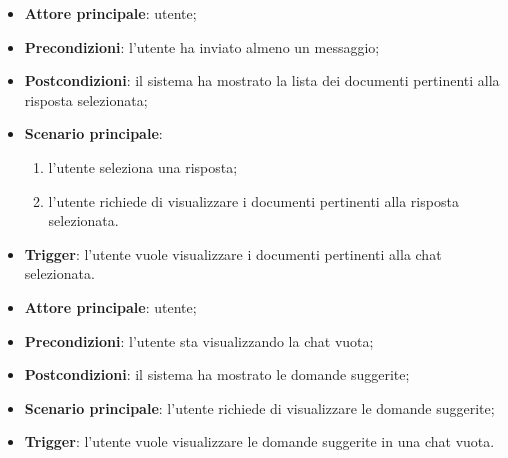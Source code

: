\documentclass[10pt, a4paper]{article}
\begin{document}
    \begin{itemize}
        \item \textbf{Attore principale}: utente;
        \item \textbf{Precondizioni}: l’utente ha inviato almeno un messaggio;
        \item \textbf{Postcondizioni}: il sistema ha mostrato la lista dei documenti pertinenti alla risposta selezionata;
        \item \textbf{Scenario principale}:
            \begin{enumerate}
                \item l’utente seleziona una risposta;
                \item l’utente richiede di visualizzare i documenti pertinenti alla risposta selezionata.
            \end{enumerate}
        \item \textbf{Trigger}: l’utente vuole visualizzare i documenti pertinenti alla chat selezionata.
    \end{itemize}

    \begin{itemize}
        \item \textbf{Attore principale}: utente;
        \item \textbf{Precondizioni}: l’utente sta visualizzando la chat vuota;
        \item \textbf{Postcondizioni}: il sistema ha mostrato le domande suggerite;
        \item \textbf{Scenario principale}: l’utente richiede di visualizzare le domande suggerite;
        \item \textbf{Trigger}: l’utente vuole visualizzare le domande suggerite in una chat vuota.
    \end{itemize}
\end{document}
